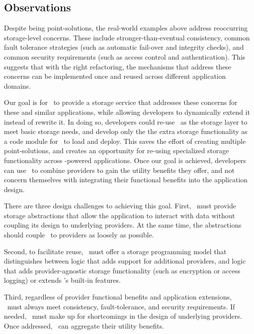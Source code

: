 \subsection{Observations}

Despite being point-solutions, the real-world examples above address reoccurring 
storage-level concerns.  These include stronger-than-eventual consistency, 
common fault tolerance strategies (such as automatic fail-over and integrity checks),
and common security requirements (such as access control and authentication).  This suggests 
that with the right refactoring, the mechanisms that address these 
concerns can be implemented once and reused across different application domains.

Our goal is for \Syndicate\ to provide a storage service that 
addresses these concerns for these and similar applications, while allowing developers
to dynamically extend it instead of rewrite it.  In doing so, developers could re-use \Syndicate\ as the 
storage layer to meet basic storage needs, and develop only the 
the extra storage functionality as a code module for \Syndicate\ to load and deploy.  This saves the effort of
creating multiple point-solutions, and creates an opportunity for re-using specialized 
storage functionality across \Syndicate-powered applications.  Once our goal is achieved, 
developers can use \Syndicate\ to combine providers to gain the utility benefits they offer, and not concern 
themselves with integrating their functional benefits into the application design.

There are three design challenges to achieving this goal.  First, \Syndicate\ must provide  
storage abstractions that allow the application to interact with data without 
coupling its design to underlying providers.  At the same time, the abstractions should 
couple \Syndicate\ to providers as loosely as possible.

Second, to facilitate reuse, \Syndicate\ must offer a storage programming model 
that distinguishes between logic that adds support for additional providers, and logic 
that adds provider-agnostic storage functionality (such as encryption or access logging)
or extends \Syndicate's built-in features.

Third, regardless of provider functional benefits and application extensions, \Syndicate\ must always meet consistency, fault-tolerance, 
and security requirements.  If needed, \Syndicate\ must make up for shortcomings in the design of underlying providers.
Once addressed, \Syndicate\ can aggregate their utility benefits.



